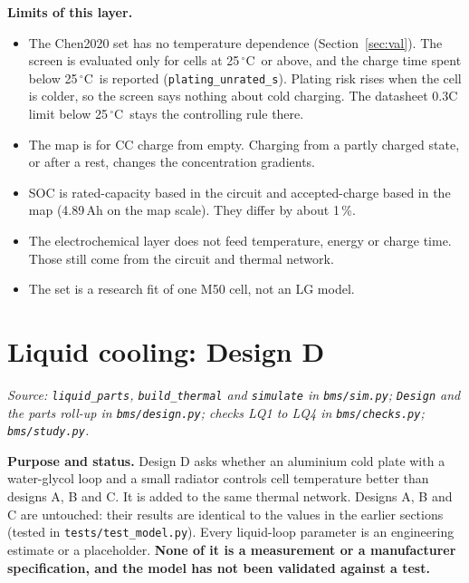 \documentclass[11pt,a4paper]{article}
\newcommand{\degC}{\ensuremath{{}^{\circ}\mathrm{C}}}
\begin{document}
\textbf{Limits of this layer.}
\begin{itemize}
\item The Chen2020 set has no temperature dependence (Section~\ref{sec:val}). The screen is evaluated only for cells at 25\,\degC\ or above, and the charge time spent below 25\,\degC\ is reported (\texttt{plating\_unrated\_s}). Plating risk rises when the cell is colder, so the screen says nothing about cold charging. The datasheet 0.3C limit below 25\,\degC\ stays the controlling rule there.
\item The map is for CC charge from empty. Charging from a partly charged state, or after a rest, changes the concentration gradients.
\item SOC is rated-capacity based in the circuit and accepted-charge based in the map (4.89\,Ah on the map scale). They differ by about 1\,\%.
\item The electrochemical layer does not feed temperature, energy or charge time. Those still come from the circuit and thermal network.
\item The set is a research fit of one M50 cell, not an LG model.
\end{itemize}


\section{Liquid cooling: Design D}\label{sec:liquid}
\emph{Source: \texttt{liquid\_parts}, \texttt{build\_thermal} and \texttt{simulate} in \texttt{bms/sim.py}; \texttt{Design} and the parts roll-up in \texttt{bms/design.py}; checks LQ1 to LQ4 in \texttt{bms/checks.py}; \texttt{bms/study.py}.}

\textbf{Purpose and status.} Design D asks whether an aluminium cold plate with a water-glycol loop and a small radiator controls cell temperature better than designs A, B and C. It is added to the same thermal network. Designs A, B and C are untouched: their results are identical to the values in the earlier sections (tested in \texttt{tests/test\_model.py}). Every liquid-loop parameter is an engineering estimate or a placeholder. \textbf{None of it is a measurement or a manufacturer specification, and the model has not been validated against a test.}
\end{document}
